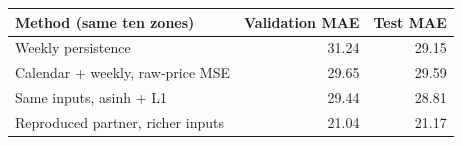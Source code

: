 \begin{tabular}{lrr}
\toprule
Method (same ten zones) & Validation MAE & Test MAE \\
\midrule
Weekly persistence & 31.24 & 29.15 \\
Calendar + weekly, raw-price MSE & 29.65 & 29.59 \\
Same inputs, asinh + L1 & 29.44 & 28.81 \\
Reproduced partner, richer inputs & 21.04 & 21.17 \\
\bottomrule
\end{tabular}
